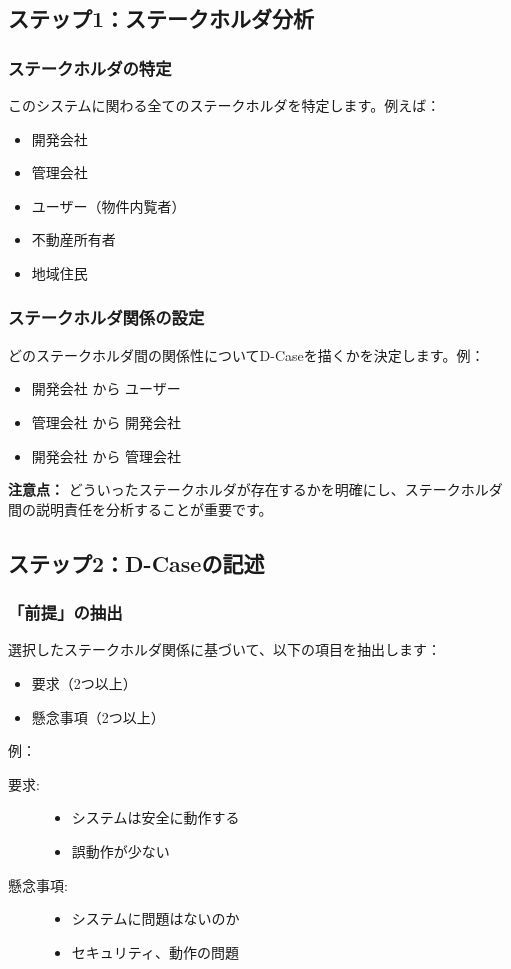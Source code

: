 \subsection{ステップ1：ステークホルダ分析}

\subsubsection{ステークホルダの特定}
このシステムに関わる全てのステークホルダを特定します。例えば：
\begin{itemize}
    \item 開発会社
    \item 管理会社
    \item ユーザー（物件内覧者）
    \item 不動産所有者
    \item 地域住民
\end{itemize}

\subsubsection{ステークホルダ関係の設定}
どのステークホルダ間の関係性についてD-Caseを描くかを決定します。例：
\begin{itemize}
    \item 開発会社 から ユーザー
    \item 管理会社 から 開発会社
    \item 開発会社 から 管理会社
\end{itemize}

\textbf{注意点：} どういったステークホルダが存在するかを明確にし、ステークホルダ間の説明責任を分析することが重要です。

\subsection{ステップ2：D-Caseの記述}

\subsubsection{「前提」の抽出}
選択したステークホルダ関係に基づいて、以下の項目を抽出します：
\begin{itemize}
    \item 要求（2つ以上）
    \item 懸念事項（2つ以上）
\end{itemize}

例：
\begin{description}
    \item[要求:] 
    \begin{itemize}
        \item システムは安全に動作する
        \item 誤動作が少ない
    \end{itemize}
    \item[懸念事項:] 
    \begin{itemize}
        \item システムに問題はないのか
        \item セキュリティ、動作の問題
    \end{itemize}
\end{description}

